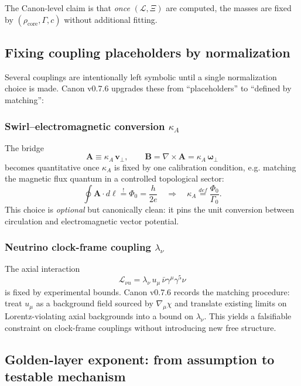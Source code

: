 \documentclass[10pt]{article}
\newcommand{\rhocore}{\rho_{\text{core}}}
\begin{document}
The Canon-level claim is that \emph{once} $(\mathcal{L},\Xi)$ are computed, the masses
are fixed by $(\rhocore,\Gamma,c)$ without additional fitting.

\subsection{Fixing coupling placeholders by normalization}
\label{sec:coupling_normalization}

Several couplings are intentionally left symbolic until a single normalization
choice is made. Canon v0.7.6 upgrades these from ``placeholders'' to ``defined by
matching'':

\subsubsection{Swirl--electromagnetic conversion $\kappa_A$}
The bridge
\begin{equation}
\mathbf{A}\equiv \kappa_A\,\mathbf{v}_\perp,\qquad
\mathbf{B}=\nabla\times\mathbf{A}=\kappa_A\,\boldsymbol{\omega}_\perp
\end{equation}
becomes quantitative once $\kappa_A$ is fixed by one calibration condition, e.g.
matching the magnetic flux quantum in a controlled topological sector:
\begin{equation}
\oint \mathbf{A}\cdot d\boldsymbol{\ell} \stackrel{!}{=} \Phi_0=\frac{h}{2e}
\quad\Rightarrow\quad
\kappa_A \stackrel{def}{=}\frac{\Phi_0}{\Gamma_0}.
\end{equation}
This choice is \emph{optional} but canonically clean: it pins the unit
conversion between circulation and electromagnetic vector potential.

\subsubsection{Neutrino clock-frame coupling $\lambda_\nu$}
The axial interaction
\begin{equation}
\mathcal{L}_{\nu u}=\lambda_\nu\,u_\mu\,\bar{\nu}\gamma^\mu\gamma^5\nu
\end{equation}
is fixed by experimental bounds. Canon v0.7.6 records the matching procedure:
treat $u_\mu$ as a background field sourced by $\nabla_\mu\chi$ and translate existing
limits on Lorentz-violating axial backgrounds into a bound on $\lambda_\nu$.
This yields a falsifiable constraint on clock-frame couplings without introducing
new free structure.

\subsection{Golden-layer exponent: from assumption to testable mechanism}
\label{sec:phi_exponent_program}
\end{document}
